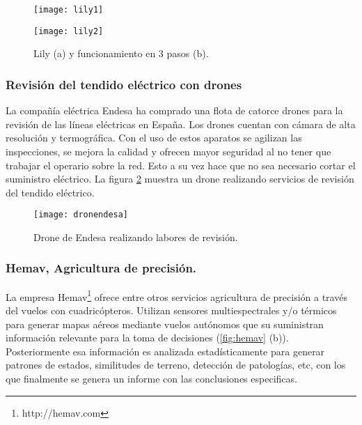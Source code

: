 \begin{figure}[h!]
\centering
\texttt{[image: lily1]}
\end{figure}

\begin{figure}[h!]
\centering
\texttt{[image: lily2]}
\caption{Lily (a) y funcionamiento en 3 pasos (b).}
\label{fig:lily}
\end{figure}

\subsubsection{Revisión del tendido eléctrico con drones}

La compañía eléctrica Endesa ha comprado una flota de catorce drones para la revisión de las líneas eléctricas en España. Los drones cuentan con cámara de alta resolución y termográfica. Con el uso de estos aparatos se agilizan las inspecciones, se mejora la calidad y ofrecen mayor seguridad al no tener que trabajar el operario sobre la red. Esto a su vez hace que no sea necesario cortar el suministro eléctrico. La figura \ref{fig:droneendesa} muestra un drone realizando servicios de revisión del tendido eléctrico.\\

\begin{figure}[h!]
\centering
\texttt{[image: dronendesa]}
\caption{Drone de Endesa realizando labores de revisión.}
\label{fig:droneendesa}
\end{figure}


\subsubsection{Hemav, Agricultura de precisión.}

La empresa Hemav\footnote{http://hemav.com} ofrece entre otros servicios agricultura de precisión a través del vuelos con cuadricópteros. Utilizan sensores multiespectrales y/o térmicos para generar mapas aéreos mediante vuelos autónomos que su suministran información relevante para la toma de decisiones (\ref{fig:hemav} (b)).\\

Posteriormente esa información es analizada estadísticamente para generar patrones de estados, similitudes de terreno, detección de patologías, etc, con los que finalmente se genera un informe con las conclusiones especificas.\\

